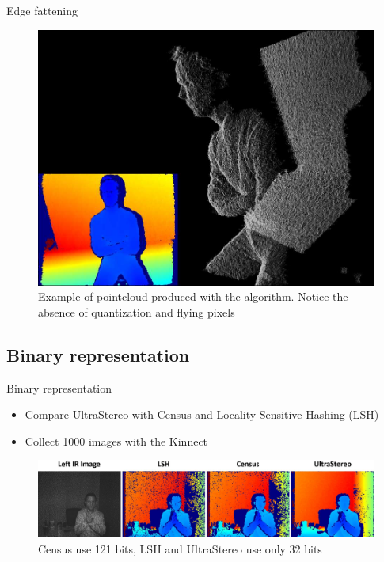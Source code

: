 \begin{frame}{Edge fattening}
\begin{figure}
\includegraphics[scale=0.15]{pictures/fig6}
\caption{Example of pointcloud produced with the algorithm. Notice the absence of quantization and flying pixels}
\end{figure}
\end{frame}

\subsection{Binary representation}
\begin{frame}{Binary representation}
\begin{itemize}
\item Compare UltraStereo with Census and Locality Sensitive Hashing (LSH)
\item Collect 1000 images with the Kinnect
\end{itemize}
\begin{figure}
\includegraphics[scale=0.15]{pictures/fig7}
\caption{Census use 121 bits, LSH and UltraStereo use only 32 bits}
\end{figure}
\end{frame}

